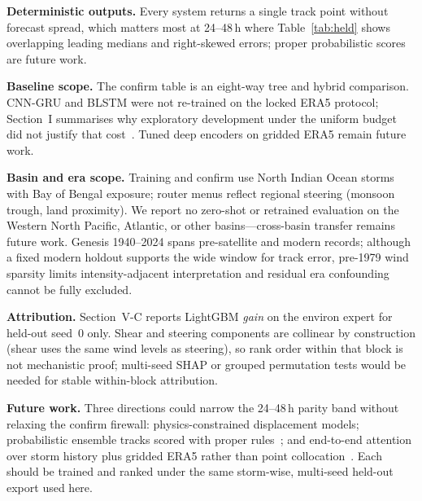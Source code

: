 \documentclass[conference]{IEEEtran}
\newcommand{\bob}{Bay of Bengal}
\newcommand{\era}{ERA5}
\begin{document}
\textbf{Deterministic outputs.} Every system returns a single track point without
forecast spread, which matters most at 24--48\,h where Table~\ref{tab:held} shows
overlapping leading medians and right-skewed errors; proper probabilistic scores~\cite{gneiting2007} are future work.

\textbf{Baseline scope.} The confirm table is an eight-way tree and hybrid
comparison. CNN-GRU and BLSTM were not re-trained on the locked \era{} protocol;
Section~I summarises why exploratory development under the uniform budget did not
justify that cost~\cite{grinsztajn2022tree}. Tuned deep encoders on gridded
\era{} remain future work.

\textbf{Basin and era scope.} Training and confirm use North Indian Ocean storms
with \bob{} exposure; router menus reflect regional steering (monsoon trough,
land proximity). We report no zero-shot or retrained evaluation on the Western
North Pacific, Atlantic, or other basins---cross-basin transfer remains future
work. Genesis 1940--2024 spans pre-satellite and modern records; although a fixed
modern holdout supports the wide window for track error, pre-1979 wind sparsity
limits intensity-adjacent interpretation and residual era confounding cannot be
fully excluded.

\textbf{Attribution.} Section~V-C reports LightGBM \emph{gain} on the environ
expert for held-out seed~0 only. Shear and steering components are collinear by
construction (shear uses the same wind levels as steering), so rank order within
that block is not mechanistic proof; multi-seed SHAP or grouped permutation tests
would be needed for stable within-block attribution.

\textbf{Future work.} Three directions could narrow the 24--48\,h parity band without
relaxing the confirm firewall: physics-constrained displacement models;
probabilistic ensemble tracks scored with proper rules~\cite{gneiting2007}; and
end-to-end attention over storm history plus gridded \era{} rather than point
collocation~\cite{qu2025accurate,giffard2020tropical}. Each should be trained and
ranked under the same storm-wise, multi-seed held-out export used here.

\end{document}
